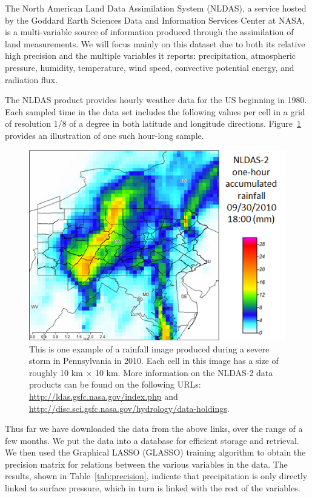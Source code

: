 \documentclass{article}
\begin{document}
The North American Land Data Assimilation System (NLDAS), a service hosted by
the Goddard Earth Sciences Data and Information Services Center at NASA, is a
multi-variable source of information produced through the assimilation of land
measurements. We will focus mainly on this dataset due to both its relative high
precision and the multiple variables it reports: precipitation, atmospheric
pressure, humidity, temperature, wind speed, convective potential energy, and
radiation flux.

The NLDAS product provides hourly weather data for the US beginning in 1980.
Each sampled time in the data set includes the following values per cell in a
grid of resolution 1/8 of a degree in both latitude and longitude directions.
Figure~\ref{fig:example_rainfall} provides an illustration of one such hour-long
sample.


\begin{figure}[ht] \vskip 0.2in
\begin{center}
\centerline{\includegraphics[bb=0 0 487 360,width=\columnwidth]{weather.png}}
\caption{This is one example of a rainfall image produced during a severe storm in Pennsylvania in 2010. Each cell in this image has a size of roughly 10 km $\times$ 10 km. More information on the NLDAS-2 data products can be found on the following URLs: \url{http://ldas.gsfc.nasa.gov/index.php} and \url{http://disc.sci.gsfc.nasa.gov/hydrology/data-holdings}.}
\label{fig:example_rainfall}
\end{center}
\vskip -0.2in
\end{figure}

Thus far we have downloaded the data from the above links, over the range of a few months. We put the data into a database for efficient storage and retrieval. We then used the Graphical LASSO (GLASSO) training algorithm to obtain the precision matrix for relations between the various variables in the data. The results, shown in Table~\ref{tab:precision}, indicate that precipitation is only directly linked to surface pressure, which in turn is linked with the rest of the variables.
\end{document}
